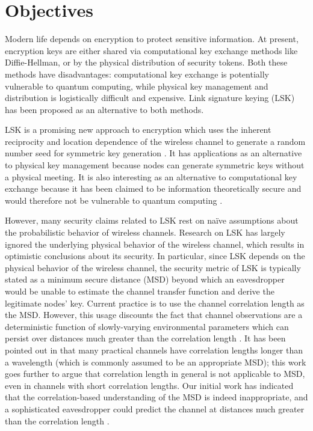 \documentclass[12pt, titlepage]{article}
\begin{document}
\section*{Objectives}
Modern life depends on encryption to protect sensitive information.  At present, encryption keys are either shared via computational key exchange methods like Diffie-Hellman, or by the physical distribution of security tokens.  Both these methods have disadvantages: computational key exchange is potentially vulnerable to quantum computing, while physical key management and distribution is logistically difficult and expensive.  Link signature keying (LSK) has been proposed as an alternative to both methods.  

LSK is a promising new approach to encryption which uses the inherent reciprocity and location dependence of the wireless channel to generate a random number seed for symmetric key generation \cite{hershey1995, hassan1996, azimisadjadi2007, mathur2008}.  It has applications as an alternative to physical key management because nodes can generate symmetric keys without a physical meeting.  It is also interesting as an alternative to computational key exchange because it has been claimed to be information theoretically secure and would therefore not be vulnerable to quantum computing \cite{ye2010}.  

However, many security claims related to LSK rest on na\"{i}ve assumptions about the probabilistic behavior of wireless channels.  Research on LSK has largely ignored the underlying physical behavior of the wireless channel, which results in optimistic conclusions about its security.  In particular, since LSK depends on the physical behavior of the wireless channel, the security metric of LSK is typically stated as a minimum secure distance (MSD) beyond which an eavesdropper would be unable to estimate the channel transfer function and derive the legitimate nodes' key. Current practice is to use the channel correlation length as the MSD.  However, this usage discounts the fact that channel observations are a deterministic function of slowly-varying environmental parameters which can persist over distances much greater than the correlation length \cite{jakes1974, duel-hallen2007}.  It has been pointed out in \cite{he2013} that many practical channels have correlation lengths longer than a wavelength (which is commonly assumed to be an appropriate MSD); this work goes further to argue that correlation length in general is not applicable to MSD, even in channels with short correlation lengths.  Our initial work has indicated that the correlation-based understanding of the MSD is indeed inappropriate, and a sophisticated eavesdropper could predict the channel at distances much greater than the correlation length \cite{kckpVTC2015, brown2015}.  
\end{document}
